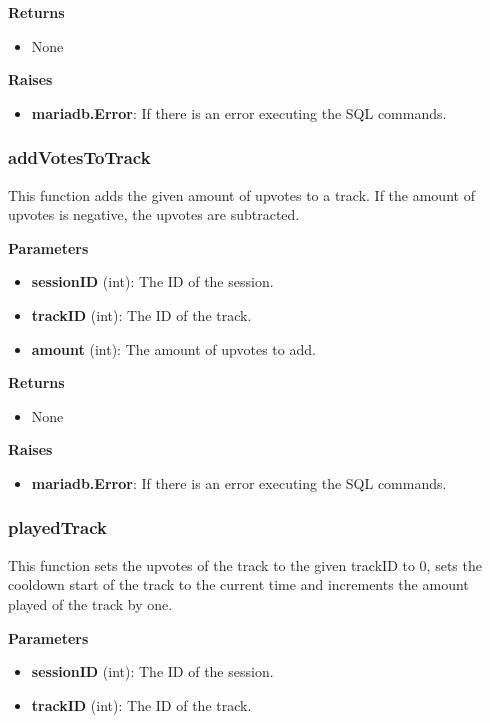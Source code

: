 \documentclass[oneside, nenglish]{sdqtechreport}
\begin{document}
\begin{itemize}
\textbf{Returns}

\begin{itemize} \item None \end{itemize}

\textbf{Raises}

\begin{itemize} \item \textbf{mariadb.Error}: If there is an error executing the SQL commands. \end{itemize}

\subsubsection{addVotesToTrack}

This function adds the given amount of upvotes to a track. If the amount of upvotes is negative, the upvotes are subtracted.

\textbf{Parameters}

\begin{itemize} \item \textbf{sessionID} (int): The ID of the session. \item \textbf{trackID} (int): The ID of the track. \item \textbf{amount} (int): The amount of upvotes to add. \end{itemize}

\textbf{Returns}

\begin{itemize} \item None \end{itemize}

\textbf{Raises}

\begin{itemize} \item \textbf{mariadb.Error}: If there is an error executing the SQL commands. \end{itemize}

\subsubsection{playedTrack}

This function sets the upvotes of the track to the given trackID to 0, sets the cooldown start of the track to the current time and increments the amount played of the track by one.

\textbf{Parameters}

\begin{itemize} \item \textbf{sessionID} (int): The ID of the session. \item \textbf{trackID} (int): The ID of the track. \end{itemize}


\end{itemize}
\end{document}
